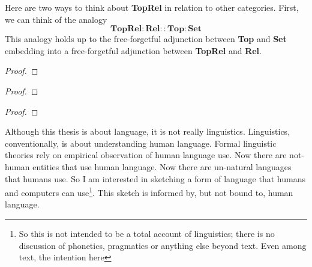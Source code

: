 Here are two ways to think about \textbf{TopRel} in relation to other categories. First, we can think of the analogy
\[\mathbf{TopRel}:\mathbf{Rel}::\mathbf{Top}:\mathbf{Set}\]
This analogy holds up to the free-forgetful adjunction between \textbf{Top} and \textbf{Set} embedding into a free-forgetful adjunction between \textbf{TopRel} and \textbf{Rel}.



\begin{proposition}

\begin{proof}

\end{proof}
\end{proposition}


\begin{proposition}

\begin{proof}

\end{proof}
\end{proposition}

\begin{rem}

\end{rem}

\begin{proposition}

\begin{proof}

\end{proof}
\end{proposition}



Although this thesis is about language, it is not really linguistics.
Linguistics, conventionally, is about understanding human language.
Formal linguistic theories rely on empirical observation of human language use.
Now there are not-human entities that use human language.
Now there are un-natural languages that humans use.
So I am interested in sketching a form of language that humans and computers can use\footnote{So this is not intended to be a total account of linguistics; there is no discussion of phonetics, pragmatics or anything else beyond text. Even among text, the intention here}.
This sketch is informed by, but not bound to, human language.\\

